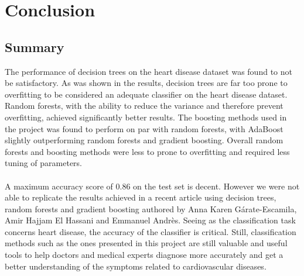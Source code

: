\documentclass[a4paper,twocolumn]{article}
\begin{document}
\section{Conclusion}
\subsection{Summary}
The performance of decision trees on the heart disease dataset was found to not be satisfactory. As was shown in the results, decision trees are far too prone to overfitting to be considered an adequate classifier on the heart disease dataset. Random forests, with the ability to reduce the variance and therefore prevent overfitting, achieved significantly better results. The boosting methods used in the project was found to perform on par with random forests, with AdaBoost slightly outperforming random forests and gradient boosting. Overall random forests and boosting methods were less to prone to overfitting and required less tuning of parameters.\\
\\
A maximum accuracy score of $0.86$ on the test set is decent. However we were not able to replicate the results achieved in a recent article\cite{introarticle} using decision trees, random forests and gradient boosting authored by Anna Karen Gárate-Escamila, Amir Hajjam El Hassani and Emmanuel Andrès. Seeing as the classification task concerns heart disease, the accuracy of the classifier is critical. Still, classification methods such as the ones presented in this project are still valuable and useful tools to help doctors and medical experts diagnose more accurately and get a better understanding of the symptoms related to cardiovascular diseases.
\end{document}
